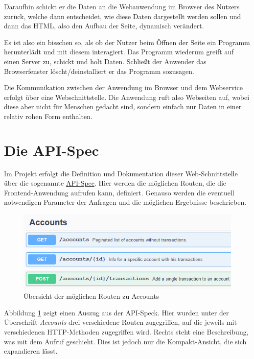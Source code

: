 \documentclass[a4paper, 11pt]{article}
\begin{document}
Daraufhin schickt er die Daten an die Webanwendung im Browser des Nutzers
zurück, welche dann entscheidet, wie diese Daten dargestellt werden sollen und
dann das HTML, also den Aufbau der Seite, dynamisch verändert.

Es ist also ein bisschen so, als ob der Nutzer beim Öffnen der Seite ein
Programm herunterlädt und mit diesem interagiert. Das Programm wiederum greift
auf einen Server zu, schickt und holt Daten. Schließt der Anwender das
Browserfenster löscht/deinstalliert er das Programm sozusagen.

Die Kommunikation zwischen der Anwendung im Browser und dem Webservice erfolgt
über eine Webschnittstelle. Die Anwendung ruft also Webseiten auf, wobei diese
aber nicht für Menschen gedacht sind, sondern einfach nur Daten in einer
relativ rohen Form enthalten.

\section{Die API-Spec}

Im Projekt erfolgt die Definition und Dokumentation dieser Web-Schnittstelle
über die sogenannte \href{https://wwi16ama.feste-ip.net/swagger/}{API-Spec}.
Hier werden die möglichen Routen, die die Frontend-Anwendung aufrufen kann,
definiert. Genauso werden die eventuell notwendigen Parameter der Anfragen und
die möglichen Ergebnisse beschrieben.

\begin{figure}[htpb]
    \centering
    \includegraphics{images/api_spec_example_short.png}
    \caption{Übersicht der möglichen Routen zu Accounts}
    \label{fig:api_spec_accs}
\end{figure}

Abbildung \ref{fig:api_spec_accs} zeigt einen Auszug aus der API-Speck. Hier
wurden unter der Überschrift \emph{Accounts} drei verschiedene Routen
zugegriffen, auf die jeweils mit verschiedenen HTTP-Methoden zugegriffen wird.
Rechts steht eine Beschreibung, was mit dem Aufruf geschieht. Dies ist jedoch nur die Kompakt-Ansicht, die sich expandieren lässt.
\end{document}
